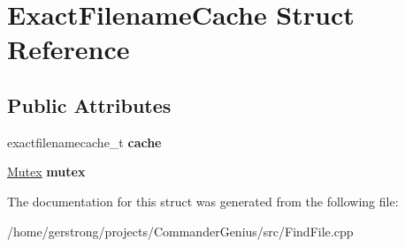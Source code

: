 \hypertarget{struct_exact_filename_cache}{
\section{ExactFilenameCache Struct Reference}
\label{struct_exact_filename_cache}
}
\subsection*{Public Attributes}
\begin{DoxyCompactItemize}
\item 
\hypertarget{struct_exact_filename_cache_a74baf6391fcda75e5599713db90a3eaa}{
exactfilenamecache\_\-t {\bfseries cache}}
\label{struct_exact_filename_cache_a74baf6391fcda75e5599713db90a3eaa}

\item 
\hypertarget{struct_exact_filename_cache_ab5c341bd9aee317f02833a5c864cd08a}{
\hyperlink{class_mutex}{Mutex} {\bfseries mutex}}
\label{struct_exact_filename_cache_ab5c341bd9aee317f02833a5c864cd08a}

\end{DoxyCompactItemize}


The documentation for this struct was generated from the following file:\begin{DoxyCompactItemize}
\item 
/home/gerstrong/projects/CommanderGenius/src/FindFile.cpp\end{DoxyCompactItemize}
